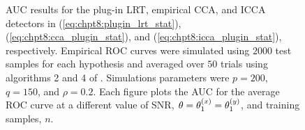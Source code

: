 \begin{figure} 
  \caption{AUC results for the plug-in LRT, empirical CCA, and ICCA detectors in
    (\ref{eq:chpt8:plugin_lrt_stat}), (\ref{eq:chpt8:cca_plugin_stat}), and
    (\ref{eq:chpt8:icca_plugin_stat}), respectively. Empirical ROC curves were simulated using
    $2000$ test samples for each hypothesis and averaged over $50$ trials using
    algorithms 2 and 4 of \cite{fawcett2006introduction}. Simulations parameters were
    $p=200$, $q=150$, and $\rho=0.2$. Each figure plots the AUC for the average ROC curve
    at a different value of SNR, $\theta=\theta^{(x)}_1=\theta^{(y)}_1$, and training samples, $n$.}
  \label{fig:chpt8:auc_low_rho}
\end{figure}


